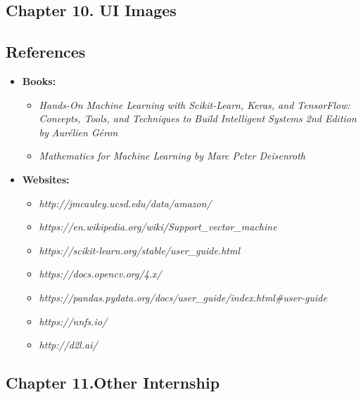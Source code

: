 \documentclass[12pt]{article}
\begin{document}
\pagebreak\newpage

\begin{center}\section*{\Large {Chapter 10. UI Images}}\end{center}

\pagebreak\newpage


\begin{center}\section*{\Large References}\end{center}
\vspace{0.6cm}
\begin{itemize}
    \item \textbf{Books:}\\
    \begin{itemize}
        \item 
\emph{Hands-On Machine Learning with Scikit-Learn, Keras, and TensorFlow: Concepts, Tools, and Techniques to Build Intelligent Systems 2nd Edition by Aurélien Géron }
\item \emph{Mathematics for Machine Learning by Marc Peter Deisenroth}
    \end{itemize}
    \item \textbf{Websites:}\\
    \begin{itemize}
        \item \emph{http://jmcauley.ucsd.edu/data/amazon/}
        \item \emph{https://en.wikipedia.org/wiki/Support\_vector\_machine}
        \item \emph{https://scikit-learn.org/stable/user\_guide.html}
        \item \emph{https://docs.opencv.org/4.x/}
        \item \emph{https://pandas.pydata.org/docs/user\_guide/index.html\#user-guide}
        \item \emph{https://nnfs.io/}
        \item \emph{http://d2l.ai/}
        
    \end{itemize}
    
\end{itemize}

\pagebreak\newpage

\begin{center}\section*{\Large {Chapter 11.Other Internship}}\end{center}
\pagebreak\newpage
\end{document}
